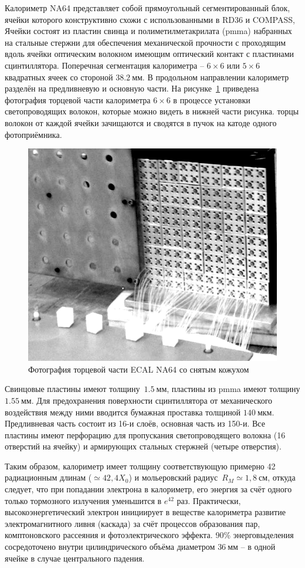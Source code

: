 Калориметр NA64 представляет собой прямоугольный сегментированный блок, ячейки
которого конструктивно схожи с использованными в RD36 и COMPASS,
Ячейки состоят из пластин свинца и
полиметилметакрилата (\acrshort{pmma})
набранных на стальные стержни для обеспечения механической
прочности с проходящим вдоль ячейки оптическим волокном имеющим оптический
контакт с пластинами сцинтиллятора.
Поперечная сегментация калориметра -- $6 \times 6$ или $5 \times 6$ квадратных
ячеек со стороной $38.2~\text{мм}$.
В продольном направлении калориметр разделён на предливневую и основную
части. На рисунке~\ref{fig:ecal-assembly-photo-opened} приведена фотография
торцевой части калориметра $6 \times 6$ в процессе установки светопроводящих
волокон, которые можно видеть в нижней части рисунка. торцы волокон от каждой
ячейки зачищаются и сводятся в пучок на катоде одного фотоприёмника.
\begin{figure}[h]
    \centering
    \includegraphics[width=0.5\linewidth]{images/illustrative/ecal-assembly-photo-opened.png}
    \caption{Фотография торцевой части ECAL NA64 со снятым кожухом}
    \label{fig:ecal-assembly-photo-opened}
\end{figure}
Свинцовые пластины имеют толщину~$1.5~\text{мм}$,
пластины из \acrshort{pmma} имеют толщину $1.55~\text{мм}$.
Для предохранения поверхности сцинтиллятора от механического
воздействия между ними вводится бумажная проставка толщиной $140~\text{мкм}$.
Предливневая часть состоит из 16-и слоёв, основная часть из 150-и.
Все пластины имеют перфорацию для пропускания светопроводящего волокна
(16 отверстий на ячейку) и армирующих стальных стержней (четыре отверстия).

Таким образом, калориметр имеет толщину соответствующую примерно 42
радиационным длинам ($\simeq42{,}4 X_0$) и мольеровский
радиус~$R_M\simeq1{,}8~\text{см}$, откуда следует, что при попадании
электрона в калориметр, его энергия
за счёт одного только тормозного излучения уменьшится в $e^{42}$ раз.
Практически, высокоэнергетический электрон инициирует
в веществе калориметра развитие электромагнитного ливня (каскада) за
счёт процессов образования пар, комптоновского рассеяния и
фотоэлектрического эффекта. 90\% энерговыделения сосредоточено
внутри цилиндрического объёма диаметром $36~\text{мм}$ -- в одной
ячейке в случае центрального падения.


